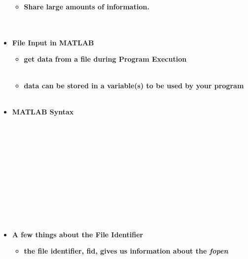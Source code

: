 \documentclass[11pt]{article}
\begin{document}
\begin{itemize}
\begin{itemize}
	\item \textbf{ \LARGE Share large amounts of information.}\\\\\\
	

\end{itemize}
		
		
		\item \textbf{ \LARGE  \color{mypurple}File Input \color{black} in MATLAB }\\
		\begin{itemize}
	\item \textbf{ \LARGE get data from a file during \color{mypurple}Program Execution \color{black}  }\\\\
	\item \textbf{ \LARGE data can be stored in a variable(s) to be used by your program  }\\\\
	\end{itemize}
	
	\item \textbf{ \LARGE  MATLAB  \color{mypurple}Syntax\color{black} }\\\\\\
	
	  \\\\\\

  \\\\\\

  \\\\\\
 	
\newpage

	\item \textbf{ \LARGE A few things about the \color{blue}File Identifier \color{black} }\\
\begin{itemize}
	\item \textbf{ \Large  \color{black} the file identifier, fid, gives us information about the {\it fopen}}\vspace{5mm} \\
	

\end{itemize}
\end{itemize}
\end{document}
